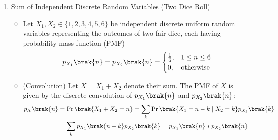 \begin{enumerate}[label=\thesubsection.\arabic*, ref=\thesubsection.\theenumi,itemsep=0pt]
\item Sum of Independent Discrete Random Variables (Two Dice Roll)
\begin{itemize}
\item Let $X_1, X_2 \in \{1, 2, 3, 4, 5, 6\}$ be independent discrete uniform random variables representing the outcomes of two fair dice, each having probability mass function (PMF)
\begin{align}
p_{X_1}\brak{n} = p_{X_2}\brak{n} = \begin{cases} 
\frac{1}{6}, & 1 \le n \le 6 \\ 
0, & \text{otherwise} 
\end{cases} 
\label{eq:EE26BTECH11213-dice_uniform_pmf}
\end{align}

\item (Convolution) Let $X = X_1 + X_2$ denote their sum. The PMF of $X$ is given by the discrete convolution of $p_{X_1}\brak{n}$ and $p_{X_2}\brak{n}$:
\begin{align}
p_X\brak{n} &= \Pr\brak{X_1 + X_2 = n} = \sum_{k} \Pr\brak{X_1 = n - k \mid X_2 = k} p_{X_2}\brak{k} \\
&= \sum_{k} p_{X_1}\brak{n - k} p_{X_2}\brak{k} = p_{X_1}\brak{n} * p_{X_2}\brak{n} \label{eq:EE26BTECH11213-dice_convolution}
\end{align}


\end{itemize}
\end{enumerate}
